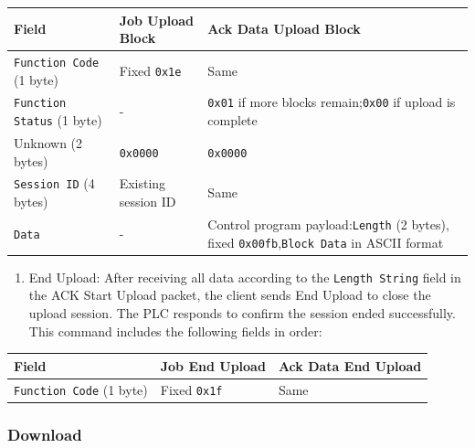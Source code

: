 ﻿\documentclass[../main.tex]{subfiles}
\begin{document}
\begin{table}[H]
    \centering
    \footnotesize
    \begin{tabular}{|>{\raggedright\arraybackslash}p{2.6cm}|>{\raggedright\arraybackslash}p{4.1cm}|>{\raggedright\arraybackslash}p{6.3cm}|}
        \hline
        Field & Job Upload Block & Ack Data Upload Block \\
        \hline
        \texttt{Function Code} (1 byte) & Fixed \texttt{0x1e} & Same \\
        \hline
        \texttt{Function Status} (1 byte) &
        - &
        \texttt{0x01} if more blocks remain;\linebreak \texttt{0x00} if upload is complete \\
        \hline
        Unknown (2 bytes) & \texttt{0x0000} & \texttt{0x0000} \\
        \hline
        \texttt{Session ID} (4 bytes) & Existing session ID & Same \\
        \hline
        \texttt{Data} &
        - &
        Control program payload:\linebreak \texttt{Length} (2 bytes), fixed \texttt{0x00fb},\linebreak \texttt{Block Data} in ASCII format \\
        \hline
    \end{tabular}
\end{table}


\begin{enumerate}
    \item End Upload: After receiving all data according to the \texttt{Length String} field in the ACK Start Upload packet, the client sends End Upload to close the upload session. The PLC responds to confirm the session ended successfully. This command includes the following fields in order:
\end{enumerate}


\begin{table}[H]
    \centering
    \footnotesize
    \begin{tabular}{|l|l|l|}
        \hline
        Field & Job End Upload & Ack Data End Upload \\
        \hline
        \texttt{Function Code} (1 byte) & Fixed \texttt{0x1f} & Same \\
        \hline
    \end{tabular}
\end{table}


\subsubsection{Download}
\end{document}
